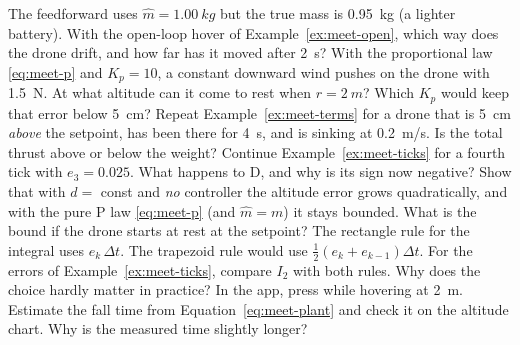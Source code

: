 \begin{exercises}
\exercise[1] The feedforward uses $\hat m = \SI{1.00}{kg}$ but the true mass is \SI{0.95}{kg} (a lighter battery). With the open-loop hover of Example~\ref{ex:meet-open}, which way does the drone drift, and how far has it moved after \SI{2}{s}?
\exercise[1] With the proportional law \eqref{eq:meet-p} and $K_p = 10$, a constant downward wind pushes on the drone with \SI{1.5}{N}. At what altitude can it come to rest when $r = \SI{2}{m}$? Which $K_p$ would keep that error below \SI{5}{cm}?
\exercise[1] Repeat Example~\ref{ex:meet-terms} for a drone that is \SI{5}{cm} \emph{above} the setpoint, has been there for \SI{4}{s}, and is sinking at \SI{0.2}{m/s}. Is the total thrust above or below the weight?
\exercise[2] Continue Example~\ref{ex:meet-ticks} for a fourth tick with $e_3 = 0.025$. What happens to D, and why is its sign now negative?
\exercise[2] Show that with $d = $ const and \emph{no} controller the altitude error grows quadratically, and with the pure P law \eqref{eq:meet-p} (and $\hat m = m$) it stays bounded. What is the bound if the drone starts at rest at the setpoint?
\exercise[3] The rectangle rule for the integral uses $e_k\,\Delta t$. The trapezoid rule would use $\tfrac12(e_k + e_{k-1})\Delta t$. For the errors of Example~\ref{ex:meet-ticks}, compare $I_2$ with both rules. Why does the choice hardly matter in practice?
\exercise[3] In the app, press  while hovering at \SI{2}{m}. Estimate the fall time from Equation~\eqref{eq:meet-plant} and check it on the altitude chart. Why is the measured time slightly longer?

\end{exercises}
